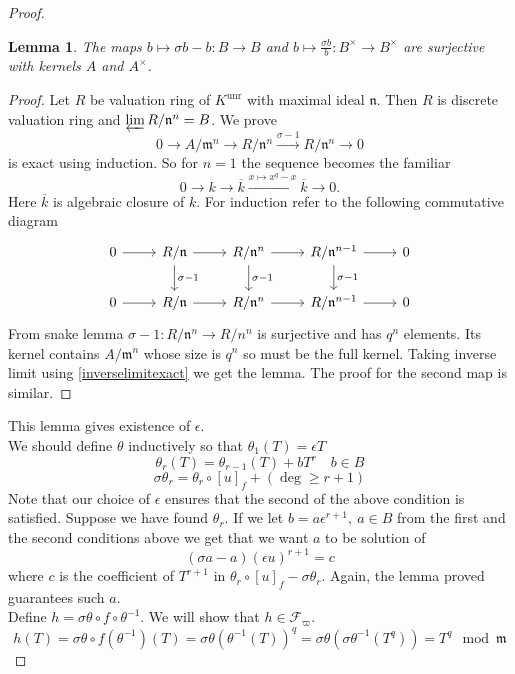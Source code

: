 \documentclass[twoside, 12pt]{iiser-thesis}
\newtheorem{lem}[thm]{ Lemma}
\newcommand{\x}{\times}
\newcommand{\un}{\text{unr}}
\begin{document}
\begin{proof}
\begin{lem}
The maps $b\mapsto \sigma b -b:B \rightarrow B$ and  $b\mapsto \frac{\sigma b}{b}:B^\times \rightarrow B^\times $  are surjective with kernels $A$ and $ A^\x$.
\end{lem}
\begin{proof}
Let $R$ be valuation ring of $K^\un$ with maximal ideal  $\mathfrak n$. Then $R$ is discrete valuation ring and $\varprojlim R/\mathfrak n ^n = B$. We prove $$0 \rightarrow A/\mathfrak m ^n \rightarrow R/\mathfrak n^n \xrightarrow{\sigma -1} R / \mathfrak n^n \rightarrow 0$$ is exact using induction. So for $n=1$ the sequence becomes the familiar $$ 0 \rightarrow k \rightarrow \overline k \xrightarrow{x \mapsto x^q-x} \overline k \rightarrow 0.$$
Here $\overline k$ is algebraic closure of $k$. For induction refer to the following commutative diagram 
\[
\begin{tikzcd}
0 \arrow[r] & R/\mathfrak n \arrow[r] \arrow[d , "\sigma -1"] & R/\mathfrak n^n \arrow[r] \arrow[d, "\sigma -1"] & R/\mathfrak n^{n-1} \arrow[r] \arrow[d, "\sigma -1"] & 0 \\
0 \arrow[r] & R/\mathfrak n \arrow[r] & R/ \mathfrak n ^n \arrow[r] & R/\mathfrak n ^{n-1} \arrow[r] & 0
\end{tikzcd}
\]
From snake lemma $\sigma -1: R/\mathfrak n^n \rightarrow R/ n ^n$ is surjective and has $q^n$ elements. Its kernel contains $A/\mathfrak m ^n$ whose size is $q^n$ so must be the full kernel. Taking inverse limit using \cref{inverselimitexact} we get the lemma. The proof for the second map is similar.
\end{proof}
This lemma gives existence of $\epsilon$. \\
We should define $\theta$ inductively so that  $\theta _1(T) = \epsilon T$ \[\theta _r(T) = \theta _{r-1} (T) + b T^r \quad b \in B\]
\[ \sigma \theta _r = \theta _r \circ [u]_f + ( \deg \geq r+1) \]
Note that our choice of $\epsilon $ ensures that the second of the above condition is satisfied. Suppose we have found $\theta _r$. If we let $b= a\epsilon ^{r+1}, \ a\in B$ from the first and the second conditions above we get that we want $a$ to be solution of \[ (\sigma a -a )(\epsilon u) ^{r+1} =c\] where $c$ is the coefficient of $T^{r+1}$ in $\theta _r \circ [u]_f - \sigma \theta _r$. Again, the lemma proved guarantees such $a$. \\
Define $h= \sigma \theta \circ f\circ \theta ^{-1}$. We will show that $h \in \mathcal F _\varpi$. 
\[ h(T)= \sigma \theta \circ f (\theta ^{-1}) (T) = \sigma \theta (\theta ^{-1}(T))^q = \sigma \theta (\sigma \theta ^{-1} (T^q)) =T^q \mod \mathfrak m\]
 \end{proof}



\end{document}

